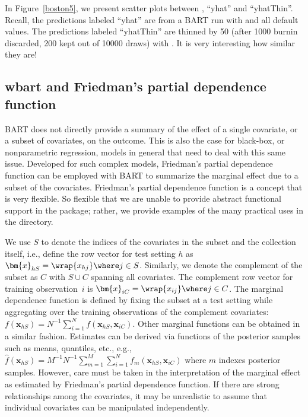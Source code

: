 \documentclass[article]{jss}
\begin{document}
In Figure~\ref{boston5}, we present scatter plots between ,
``yhat'' and ``yhatThin''.  Recall, the predictions labeled ``yhat'' are
from a BART run with  and all default values.  The
predictions labeled ``yhatThin'' are thinned by 50 (after 1000 burnin
discarded, 200 kept out of 10000 draws) with .  It is
very interesting how similar they are!

\subsection{wbart and Friedman's partial dependence function}
\label{Friedman-partial}

BART does not directly provide a summary of the effect of a single
covariate, or a subset of covariates, on the outcome.  This is also
the case for black-box, or nonparametric regression, models in general
that need to deal with this same issue.  Developed for such complex
models, Friedman's
partial dependence function \citep{Frie01} can be employed with BART
to summarize the marginal effect due to a subset of the covariates.
Friedman's partial dependence function is a concept that is
very flexible.  So flexible that we are unable to provide abstract
functional support in the  package; rather, we provide
examples of the many practical uses in the  directory.

We use $S$ to denote the indices of the covariates in the subset and
the collection itself, i.e., define the row vector for test setting
$h$ as $\bm{x}_{hS}=\wrap{{x}_{hj}} \where j \in S$.  Similarly, we
denote the complement of the subset as $C$ with $S \cup C$ spanning
all covariates.  The complement row vector for training
observation~$i$ is $\bm{x}_{iC}=\wrap{{x}_{ij}} \where j \in C$.  The
marginal dependence function is defined by fixing the subset at a test
setting while aggregating over the training observations of the
complement covariates:
$f(\bm{x}_{hS})={N^{-1}}\sum_{i=1}^N f(\bm{x}_{hS},\bm{x}_{iC})$.  
Other marginal functions can be
obtained in a similar fashion.  Estimates can be derived via functions
of the posterior samples such as means, quantiles, etc., e.g.,
$\hat{f}(\bm{x}_{hS}) = {M^{-1}} {N^{-1}} \sum_{m=1}^M \sum_{i=1}^N
f_m(\bm{x}_{hS}, \bm{x}_{iC})$ where $m$ indexes posterior samples.  
However, care must be taken in the interpretation of the marginal 
effect as estimated by Friedman's partial dependence function.  
If there are strong relationships among the covariates, it may be
unrealistic to assume that individual covariates can be manipulated
independently. 
\end{document}
